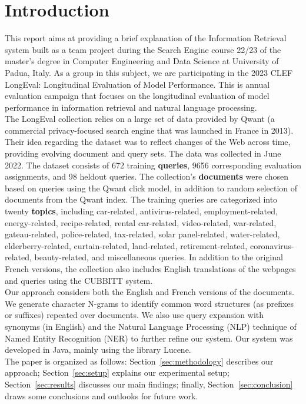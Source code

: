 \section{Introduction}\label{sec:introduction}
This report aims at providing a brief explanation of the Information Retrieval system built
as a team project during the Search Engine course 22/23 of the master’s degree in Computer
Engineering and Data Science at University of Padua, Italy.
As a group in this subject, we are participating in the 2023 CLEF LongEval: Longitudinal Evaluation of Model
Performance.
This is annual evaluation campaign that focuses on the longitudinal evaluation of model performance in information
retrieval and natural language processing.\\
The LongEval collection\cite{traindata} relies on a large set of data provided by Qwant (a commercial privacy-focused
search engine that was launched in France in 2013). %
Their idea regarding the dataset was to reflect changes of the Web across time, providing evolving document and query
sets.
The data was collected in June 2022.
The dataset consists of 672 training \textbf{queries}, 9656 corresponding evaluation assignments, and 98 heldout queries.
The collection's \textbf{documents} were chosen based on queries using the Qwant click model, in addition to random
selection of documents from the Qwant index.
The training queries are categorized into twenty \textbf{topics}, including car-related, antivirus-related,
employment-related, energy-related, recipe-related, rental car-related, video-related, war-related, gateau-related,
police-related, tax-related, solar panel-related, water-related, elderberry-related, curtain-related, land-related,
retirement-related, coronavirus-related, beauty-related, and miscellaneous queries.
In addition to the original French versions, the collection also includes English translations of the webpages and
queries using the CUBBITT system.\\
Our approach considers both the English and French versions of the documents.
We generate character N-grams to identify common word structures (as prefixes or suffixes) repeated over documents.
We also use query expansion with synonyms (in English) and the Natural Language Processing (NLP) technique of Named
Entity Recognition (NER) to further refine our system.
Our system was developed in Java, mainly using the library Lucene.\\
The paper is organized as follows: Section~\ref{sec:methodology} describes our approach;
Section~\ref{sec:setup} explains our experimental setup;
Section~\ref{sec:results} discusses our main findings; finally,
Section~\ref{sec:conclusion} draws some conclusions and outlooks for future work.